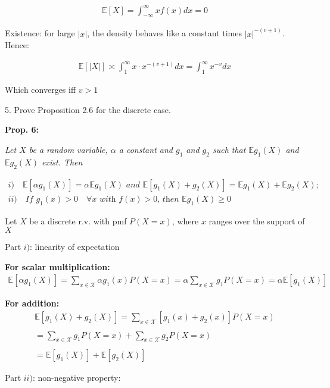 \documentclass[10pt]{article}
\begin{document}
\begin{gather*}
    \mathbb{E}[X] = \int_{-\infty}^{\infty}xf(x) dx = 0
\end{gather*}

Existence: for large $|x|$, the density behaves like a constant times $|x|^{-(v+1)}$. Hence: 

\begin{gather*}
    \mathbb{E}[|X|] \asymp \int_{1}^{\infty}x \cdot x^{-(v + 1)} dx = \int_{1}^{\infty}x^{-v} dx
\end{gather*}

Which converges iff $v > 1$

\newpage

5. Prove Proposition 2.6 for the discrete case.

\textbf{Prop. 6: }

\textit{Let $X$ be a random variable, $\alpha$ a constant and $g_1$ and $g_2$ such that $\mathbb{E}g_1(X)$ and $\mathbb{E}g_2(X)$ exist. Then}

\begin{gather*}
    i)\quad \mathbb{E}[\alpha g_1(X)] = \alpha\mathbb{E}g_1(X) \textit{ and } \mathbb{E}[g_1(X) + g_2(X)] = \mathbb{E}g_1(X) + \mathbb{E}g_2(X);\\
    ii) \quad \textit{If $g_1(x) > 0 \quad\forall x$ with $f(x) > 0$, then $\mathbb{E}g_1(X) \geq 0$}
\end{gather*}

Let $X$ be a discrete r.v. with pmf $P(X = x)$, where $x$ ranges over the support of $X$

Part $i)$: linearity of expectation 

\textbf{For scalar multiplication:}
\begin{gather*}
    \mathbb{E}[\alpha g_1(X)] = \sum_{x \in \mathcal{X}}\alpha g_1(x) P(X = x) = \alpha \sum_{x \in \mathcal{X}}g_1 P(X = x) = \alpha\mathbb{E}[g_1(X)]
\end{gather*}

\textbf{For addition:}
\begin{gather*}
    \mathbb{E}[g_1(X) + g_2(X)] = \sum_{x \in \mathcal{X}}[g_1(x) + g_2(x)]P(X = x) \\
    \\
    = \sum_{x \in \mathcal{X}}g_1 P(X = x) + \sum_{x \in \mathcal{X}}g_2 P(X = x) \\
    \\
    = \mathbb{E}[g_1(X)] + \mathbb{E}[g_2(X)]
\end{gather*}

Part $ii)$: non-negative property: 
\end{document}

